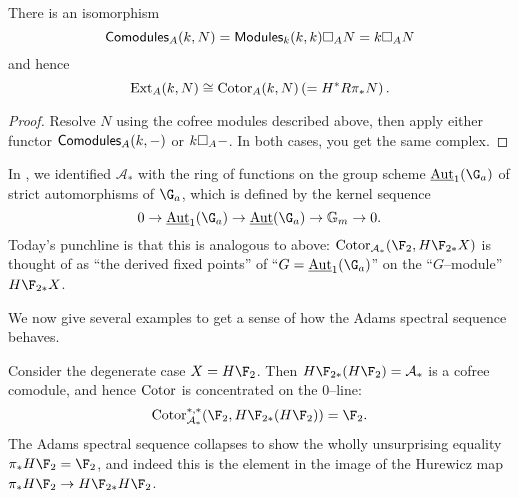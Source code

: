 \begin{corollary}
There is an isomorphism \[\mathsf{Comodules}_A(k, N) = \mathsf{Modules}_k(k, k) \square_A N = k \square_A N\] and hence \[\operatorname{Ext}_A(k, N) \cong \operatorname{Cotor}_A(k, N) \left(= H^* R\pi_* N\right).\]
\end{corollary}
\begin{proof}
Resolve $N$ using the cofree modules described above, then apply either functor $\mathsf{Comodules}_A(k, -)$ or $k \square_A -$.  In both cases, you get the same complex.
\end{proof}

\begin{example}\label{HF2HomologyIsValuedInAutGaEquivarModules}
In , we identified $\mathcal A_*$ with the ring of functions on the group scheme $\InternalAut_1(\G_a)$ of strict automorphisms of $\G_a$, which is defined by the kernel sequence \[0 \to \InternalAut_1(\G_a) \to \InternalAut(\G_a) \to \Gm \to 0.\]  Today's punchline is that this is analogous to  above: $\Cotor_{\mathcal A_*}(\F_2, H\F_{2*} X)$ is thought of as ``the derived fixed points'' of ``$G = \InternalAut_1(\G_a)$'' on the ``$G$--module'' $H\F_{2*} X$.
\end{example}

We now give several examples to get a sense of how the Adams spectral sequence behaves.

\begin{example}
Consider the degenerate case $X = H\F_2$.  Then $H\F_{2*}(H\F_2) = \mathcal A_*$ is a cofree comodule, and hence $\operatorname{Cotor}$ is concentrated on the $0$--line: \[\Cotor_{\mathcal A_*}^{*, *}(\F_2, H\F_{2*}(H\F_2)) = \F_2.\]  The Adams spectral sequence collapses to show the wholly unsurprising equality $\pi_* H\F_2 = \F_2$, and indeed this is the element in the image of the Hurewicz map $\pi_* H\F_2 \to H\F_{2*} H\F_2$.
\end{example}

